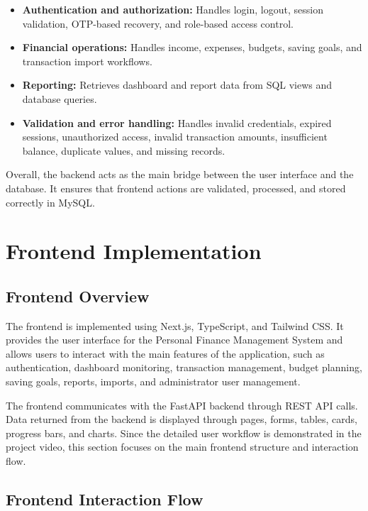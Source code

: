 ﻿\documentclass{article}
\begin{document}
\begin{itemize}
    \item \textbf{Authentication and authorization:} Handles login, logout, session validation, OTP-based recovery, and role-based access control.
    \item \textbf{Financial operations:} Handles income, expenses, budgets, saving goals, and transaction import workflows.
    \item \textbf{Reporting:} Retrieves dashboard and report data from SQL views and database queries.
    \item \textbf{Validation and error handling:} Handles invalid credentials, expired sessions, unauthorized access, invalid transaction amounts, insufficient balance, duplicate values, and missing records.
\end{itemize}

Overall, the backend acts as the main bridge between the user interface and the database. It ensures that frontend actions are validated, processed, and stored correctly in MySQL.

\section{Frontend Implementation}

\subsection{Frontend Overview}

The frontend is implemented using Next.js, TypeScript, and Tailwind CSS. It provides the user interface for the Personal Finance Management System and allows users to interact with the main features of the application, such as authentication, dashboard monitoring, transaction management, budget planning, saving goals, reports, imports, and administrator user management.

The frontend communicates with the FastAPI backend through REST API calls. Data returned from the backend is displayed through pages, forms, tables, cards, progress bars, and charts. Since the detailed user workflow is demonstrated in the project video, this section focuses on the main frontend structure and interaction flow.

\subsection{Frontend Interaction Flow}
\end{document}
